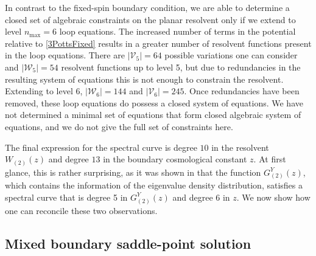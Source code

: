 In contrast to the fixed-spin boundary condition, we are able to determine a closed set of
algebraic constraints on the planar resolvent only if we extend to level $n_{\text{max}} = 6$ loop
equations. The increased number of terms in the potential relative to \eqref{3PottsFixed} results
in a greater number of resolvent functions present in the loop equations. There are
$|\mathcal{V}_5|=64$ possible variations one can consider and $|\mathcal{W}_5|=54$ resolvent
functions up to level 5, but due to redundancies in the resulting system of equations this is not
enough to constrain the resolvent. Extending to level 6, $|\mathcal{W}_6|=144$ and
$|\mathcal{V}_6|=245$. Once redundancies have been removed, these loop equations do possess a
closed system of equations. We have not determined a minimal set of equations that form closed
algebraic system of equations, and we do not give the full set of constraints here.

The final expression for the spectral curve is degree $10$ in the resolvent $W_{(2)}(z)$ and degree
$13$ in the boundary cosmological constant $z$. At first glance, this is rather surprising, as it
was shown in \cite{Niedner:2016skw} that the function $G_{(2)}^Y(z)$, which contains the
information of the eigenvalue density distribution, satisfies a spectral curve that is degree 5 in
$G_{(2)}^Y(z)$ and degree 6 in $z$. We now show how one can reconcile these two observations.

\subsection{Mixed boundary saddle-point solution}



